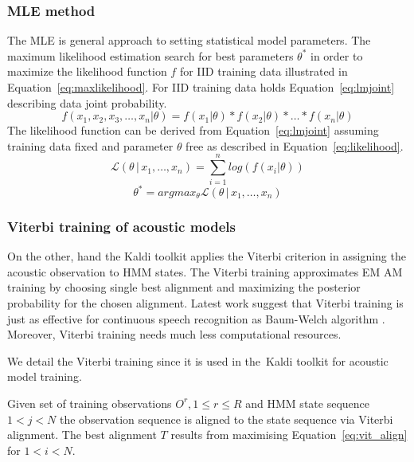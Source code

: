 {\subsubsection*{\acl{MLE} method}
\label{sub:mle_method}
The \ac{MLE} is general approach to setting statistical model parameters.
The maximum likelihood estimation search for best parameters $\theta^*$ in order to maximize the likelihood function $f$ for \ac{IID} training data illustrated in Equation~\ref{eq:maxlikelihood}.
For \ac{IID} training data holds Equation~\ref{eq:lmjoint} describing data joint probability. 
\begin{equation}\label{eq:lmjoint}
    f(x_1, x_2, x_3, \ldots, x_n | \theta) = f(x_1 | \theta) * f(x_2 | \theta) * \ldots * f(x_n | \theta)
\end{equation}
The likelihood function can be derived from Equation~\ref{eq:lmjoint} assuming training data fixed and parameter $\theta$ free as described in Equation~\ref{eq:likelihood}.
\begin{equation}\label{eq:likelihood}
    \mathcal{L}(\theta\,|\,x_1,\ldots,x_n) = \sum_{i=1}^n log(f(x_i|\theta))
\end{equation}
\begin{equation}\label{eq:maxlikelihood}
    \theta^* = argmax_{\theta} \mathcal{L}(\theta\,|\,x_1,\ldots,x_n)
\end{equation}

\subsubsection*{Viterbi training of acoustic models}
On the other, hand the Kaldi toolkit applies the Viterbi criterion in assigning the acoustic observation to \ac{HMM} states.
The Viterbi training approximates \ac{EM} \ac{AM} training by choosing single best alignment and maximizing the posterior probability for the chosen alignment.
Latest work suggest that Viterbi training is just as effective for continuous speech recognition as Baum-Welch algorithm \cite{rodriguez2003comparative}.
Moreover, Viterbi training needs much less computational resources. 

We detail the Viterbi training since it is used in the~Kaldi toolkit for acoustic model training.

Given set of training observations $O^r, 1 \le r \le R$ and \ac{HMM} state sequence $ 1 < j < N$ the observation sequence is aligned to the state sequence via Viterbi alignment.\cite{buthpitiya2012parallel}
The best alignment $T$ results from maximising Equation~\ref{eq:vit_align} for $ 1 < i < N$.

}

